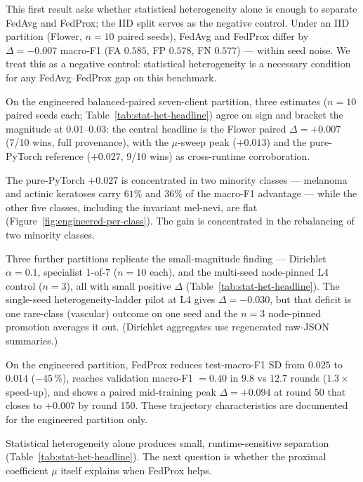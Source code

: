 \documentclass[11pt,a4paper]{report}
\begin{document}
This first result asks whether statistical heterogeneity alone is enough to
separate FedAvg and FedProx; the IID split serves as the negative control.
Under an IID partition (Flower, $n=10$ paired seeds), FedAvg and FedProx
differ by $\Delta = -0.007$ macro-F1 (FA $0.585$, FP $0.578$, FN $0.577$) ---
within seed noise. We treat this as a negative control: statistical
heterogeneity is a necessary condition for any FedAvg--FedProx gap on this
benchmark.

On the engineered balanced-paired seven-client partition, three estimates ($n=10$
paired seeds each; Table~\ref{tab:stat-het-headline}) agree on sign and bracket the
magnitude at $0.01$--$0.03$: the central headline is the Flower paired
$\Delta = +0.007$ (7/10 wins, full provenance), with the $\mu$-sweep peak
($+0.013$) and the pure-PyTorch reference ($+0.027$, 9/10 wins) as cross-runtime
corroboration.

The pure-PyTorch $+0.027$ is concentrated in two minority classes --- melanoma
and actinic keratoses carry $61\%$ and $36\%$ of the macro-F1 advantage --- while
the other five classes, including the invariant mel-nevi, are flat
(Figure~\ref{fig:engineered-per-class}). The gain is concentrated in the
rebalancing of two minority classes.

Three further partitions replicate the small-magnitude finding --- Dirichlet
$\alpha = 0.1$, specialist 1-of-7 ($n=10$ each), and the multi-seed node-pinned L4
control ($n=3$), all with small positive $\Delta$
(Table~\ref{tab:stat-het-headline}). The single-seed
heterogeneity-ladder pilot at L4 gives $\Delta = -0.030$, but that deficit is one
rare-class (vascular) outcome on one seed and the $n=3$ node-pinned promotion
averages it out. (Dirichlet aggregates use regenerated raw-JSON summaries.)

On the engineered partition, FedProx reduces test-macro-F1 SD from $0.025$
to $0.014$ ($-45\,\%$), reaches validation macro-F1 $= 0.40$ in $9.8$ vs
$12.7$ rounds ($1.3\times$ speed-up), and shows a paired mid-training peak
$\Delta = +0.094$ at round 50 that closes to $+0.007$ by round 150. These
trajectory characteristics are documented for the engineered partition only.

Statistical heterogeneity alone produces small, runtime-sensitive separation
(Table~\ref{tab:stat-het-headline}). The
next question is whether the proximal coefficient $\mu$ itself explains when
FedProx helps.


\end{document}
